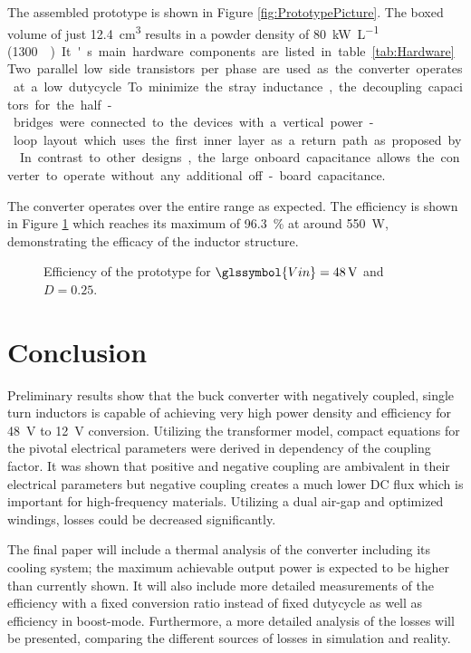 \documentclass{IPEC2026}
\newcommand{\sbl}[1]{\glssymbol{#1}}
\begin{document}
The assembled prototype is shown in Figure \ref{fig:PrototypePicture}. The boxed volume of just \qty{12.4}{\cubic\cm} results in a powder density of \qty{80}{\kW\per\liter} (\qty{1300}{\W\per\cubic\inch}). It's main hardware components are listed in table \ref{tab:Hardware}. Two parallel low side transistors per phase are used as the converter operates at a low dutycycle. To minimize the stray inductance, the decoupling capacitors for the half-bridges were connected to the devices with a vertical power-loop layout which uses the first inner layer as a return path as proposed by \cite{reuschUnderstandingEffectPCB2014}. In contrast to other designs, the large onboard capacitance allows the converter to operate without any additional off-board capacitance. \par
The converter operates over the entire range as expected. The efficiency is shown in Figure \ref{fig:Efficiency} which reaches its maximum of \qty{96.3}{\percent} at around \qty{550}{\W}, demonstrating the efficacy of the inductor structure.  %

\begin{figure}
  \centering
  
  \caption{Efficiency of the prototype for $\sbl{Vin}=\qty{48}{\V}$ and $D=0.25$.}
  \label{fig:Efficiency}
\end{figure}

\section{Conclusion}
Preliminary results show that the buck converter with negatively coupled, single turn inductors is capable of achieving very high power density and efficiency for \qty{48}{\V} to \qty{12}{\V} conversion. Utilizing the transformer model, compact equations for the pivotal electrical parameters were derived in dependency of the coupling factor. It was shown that positive and negative coupling are ambivalent in their electrical parameters but negative coupling creates a much lower DC flux which is important for high-frequency materials. Utilizing a dual air-gap and optimized windings, losses could be decreased significantly. \par
The final paper will include a thermal analysis of the converter including its cooling system; the maximum achievable output power is expected to be higher than currently shown. It will also include more detailed measurements of the efficiency with a fixed conversion ratio instead of fixed dutycycle as well as efficiency in boost-mode. Furthermore, a more detailed analysis of the losses will be presented, comparing the different sources of losses in simulation and reality.



\end{document}
